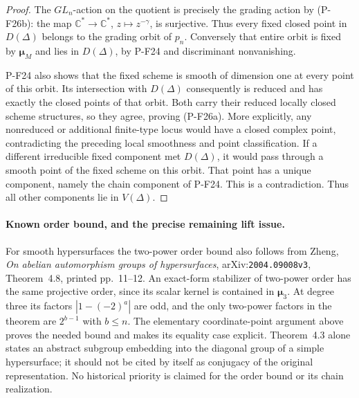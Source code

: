 \begin{proof}
The $GL_n$-action on the quotient is precisely the grading
action by (P-F26b): the map $\mathbb C^*\to\mathbb C^*$,
$z\mapsto z^{-\gamma}$, is surjective. Thus every fixed
closed point in $D(\Delta)$ belongs to the grading orbit
of $p_n$. Conversely that entire orbit is fixed by
$\boldsymbol\mu_M$ and lies in $D(\Delta)$, by P-F24 and
discriminant nonvanishing.

P-F24 also shows that the fixed scheme is smooth of dimension
one at every point of this orbit. Its intersection with
$D(\Delta)$ consequently is reduced and has exactly the
closed points of that orbit. Both carry their reduced
locally closed scheme structures, so they agree, proving
(P-F26a). More explicitly, any nonreduced or additional
finite-type locus would have a closed complex point,
contradicting the preceding local smoothness and point
classification. If a different irreducible fixed component
met $D(\Delta)$, it would pass through a smooth point of
the fixed scheme on this orbit. That point has a unique
component, namely the chain component of P-F24. This is a
contradiction. Thus all other components lie in $V(\Delta)$.
\end{proof}

\paragraph{Known order bound, and the precise remaining lift issue.}
For smooth hypersurfaces the two-power order bound also follows
from Zheng, \emph{On abelian automorphism groups of hypersurfaces},
arXiv:\texttt{2004.09008v3}, Theorem~4.8, printed pp.~11--12.
An exact-form stabilizer of two-power order has the same
projective order, since its scalar kernel is contained in
$\boldsymbol\mu_3$.
At degree three its factors $|1-(-2)^a|$ are odd, and the only
two-power factors in the theorem are $2^{b-1}$ with $b\le n$.
The elementary coordinate-point argument above proves the needed
bound and makes its equality case explicit. Theorem~4.3 alone
states an abstract subgroup embedding into the diagonal group
of a simple hypersurface; it should not be cited by itself as
conjugacy of the original representation. No historical priority
is claimed for the order bound or its chain realization.

